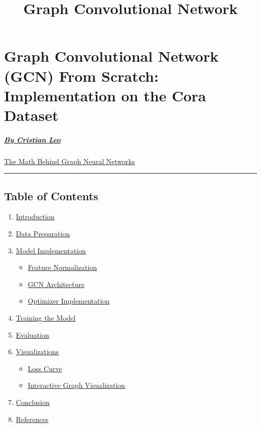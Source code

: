 \documentclass[11pt]{article}
\title{Graph Convolutional Network}
\providecommand{\tightlist}{%
      \setlength{\itemsep}{0pt}\setlength{\parskip}{0pt}}
\begin{document}
    
    \maketitle
    
    

    
    \section{Graph Convolutional Network (GCN) From Scratch: Implementation
on the Cora
Dataset}\label{graph-convolutional-network-gcn-from-scratch-implementation-on-the-cora-dataset}

\subparagraph{\texorpdfstring{\emph{\href{https://www.linkedin.com/in/cristian-leo/}{By
Cristian Leo}}}{By Cristian Leo}}\label{by-cristian-leo}

\href{https://medium.com/p/3427c16570d0/edit}{The Math Behind Graph
Neural Networks}

\begin{center}\rule{0.5\linewidth}{0.5pt}\end{center}

\subsection{Table of Contents}\label{table-of-contents}

\begin{enumerate}
\def\labelenumi{\arabic{enumi}.}
\tightlist
\item
  \hyperref[introduction]{Introduction}
\item
  \hyperref[data-preparation]{Data Preparation}
\item
  \hyperref[model-implementation]{Model Implementation}

  \begin{itemize}
  \tightlist
  \item
    \hyperref[feature-normalization]{Feature Normalization}
  \item
    \hyperref[gcn-architecture]{GCN Architecture}
  \item
    \hyperref[optimizer-implementation]{Optimizer Implementation}
  \end{itemize}
\item
  \hyperref[training-the-model]{Training the Model}
\item
  \hyperref[evaluation]{Evaluation}
\item
  \hyperref[visualizations]{Visualizations}

  \begin{itemize}
  \tightlist
  \item
    \hyperref[loss-curve]{Loss Curve}
  \item
    \hyperref[interactive-graph-visualization]{Interactive Graph Visualization}
  \end{itemize}
\item
  \hyperref[conclusion]{Conclusion}
\item
  \hyperref[references]{References}
\end{enumerate}
\end{document}
